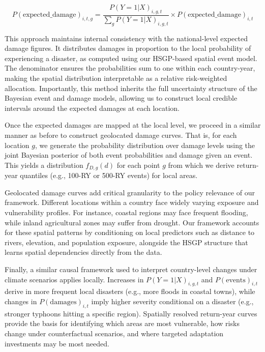 \begin{equation}
P(\text{expected\_damage})_{i,t,g} = \frac{P(Y=1|X)_{i,g,t}}{\sum_g P(Y=1|X)_{i,g,t}} \times P(\text{expected\_damage})_{i,t}
\end{equation}

This approach maintains internal consistency with the national-level expected damage figures. It distributes damages in proportion to the local probability of experiencing a disaster, as computed using our HSGP-based spatial event model. The denominator ensures the probabilities sum to one within each country-year, making the spatial distribution interpretable as a relative risk-weighted allocation. Importantly, this method inherits the full uncertainty structure of the Bayesian event and damage models, allowing us to construct local credible intervals around the expected damages at each location.

Once the expected damages are mapped at the local level, we proceed in a similar manner as before to construct geolocated damage curves. That is, for each location $g$, we generate the probability distribution over damage levels using the joint Bayesian posterior of both event probabilities and damage given an event. This yields a distribution $f_{D,g}(d)$ for each point $g$ from which we derive return-year quantiles (e.g., 100-RY or 500-RY events) for local areas.

Geolocated damage curves add critical granularity to the policy relevance of our framework. Different locations within a country face widely varying exposure and vulnerability profiles. For instance, coastal regions may face frequent flooding, while inland agricultural zones may suffer from drought. Our framework accounts for these spatial patterns by conditioning on local predictors such as distance to rivers, elevation, and population exposure, alongside the HSGP structure that learns spatial dependencies directly from the data.

Finally, a similar causal framework used to interpret country-level changes under climate scenarios applies locally. Increases in $P(Y=1|X)_{i,g,t}$ and $P(\text{events})_{i,t}$ derive in more frequent local disasters (e.g., more floods in coastal towns), while changes in $P(\text{damages})_{i,t}$ imply higher severity conditional on a disaster (e.g., stronger typhoons hitting a specific region). Spatially resolved return-year curves provide the basis for identifying which areas are most vulnerable, how risks change under counterfactual scenarios, and where targeted adaptation investments may be most needed.

\newpage
